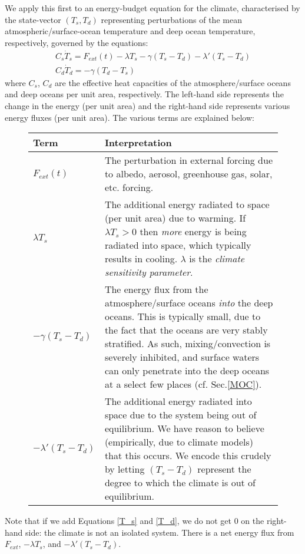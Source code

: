 We apply this first to an energy-budget equation for the climate, characterised by the state-vector $(T_s,T_d)$ representing perturbations of the mean atmospheric/surface-ocean temperature and deep ocean temperature, respectively, governed by the equations:
\begin{gather}
    \label{T_s}
    \boxed{C_s \dot{T}_s = F_{ext}(t)-\lambda T_s -\gamma (T_s-T_d) - \lambda'(T_s-T_d)}
    \\ 
    \label{T_d}
    \boxed{C_d \dot{T}_d = -\gamma (T_d-T_s)}
\end{gather}
where $C_s$, $C_d$ are the effective heat capacities of the atmosphere/surface oceans and deep oceans per unit area, respectively. The left-hand side represents the change in the energy (per unit area) and the right-hand side represents various energy fluxes (per unit area). The various terms are explained below:
\begin{figure}[H]
\begin{tabular}{|p{2.8cm}|p{13.4cm}|}
\hline
    Term & Interpretation \\
\hline
\hline
$F_{ext}(t)$ & The perturbation in external forcing due to albedo, aerosol, greenhouse gas, solar, etc. forcing.\\
\hline
$\lambda T_s$ & The additional energy radiated to space (per unit area) due to warming. If $\lambda T_s>0$ then \textit{more} energy is being radiated into space, which typically results in cooling. $\lambda$ is the \textit{climate sensitivity parameter}. \\ 
\hline
$-\gamma (T_s-T_d)$ & The energy flux from the atmosphere/surface oceans \textit{into} the deep oceans. This is typically small, due to the fact that the oceans are very stably stratified. As such, mixing/convection is severely inhibited, and surface waters can only penetrate into the deep oceans at a select few places (cf. Sec.\ref{MOC}).\\
\hline
$- \lambda'(T_s-T_d)$ & The additional energy radiated into space due to the system being out of equilibrium. We have reason to believe (empirically, due to climate models) that this occurs. We encode this crudely by letting $(T_s-T_d)$ represent the degree to which the climate is out of equilibrium.\\
\hline
\end{tabular}
\end{figure}
Note that if we add Equations \ref{T_s} and \ref{T_d}, we do not get $0$ on the right-hand side: the climate is not an isolated system. There is a net energy flux from $F_{ext}$, $-\lambda T_s$, and $-\lambda ' (T_s-T_d)$.

